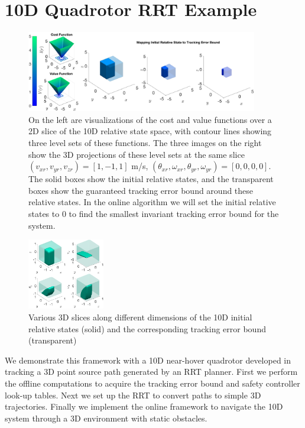 \section{10D Quadrotor RRT Example \label{sec:results}}
\begin{figure}
	\centering
	\includegraphics[width=0.9\textwidth]{fig/quad10D_example_cost}
	\caption{On the left are visualizations of the cost and value functions over a 2D slice of the 10D relative state space, with contour lines showing three level sets of these functions. The three images on the right show the 3D projections of these level sets at the same slice $(v_{xr},v_{yr},v_{zr})=[1, -1, 1]$ m/s, $(\theta_{xr},\omega_{xr},\theta_{yr},\omega_{yr})=[0,0,0,0]$. The solid boxes show the initial relative states, and the transparent boxes show the guaranteed tracking error bound around these relative states. In the online algorithm we will set the initial relative states to 0 to find the smallest invariant tracking error bound for the system.}
	\label{fig:quad10D_example}
	\end{figure} 
\begin{figure}
	\centering
	\includegraphics[width=0.3\textwidth]{fig/quad10D_slices}
	\caption{Various 3D slices along different dimensions of the 10D initial relative states (solid) and the corresponding tracking error bound (transparent)}
	\label{fig:quad10D_example_slices}
\end{figure} 
We demonstrate this framework with a 10D near-hover quadrotor developed in \cite{Bouffard12} tracking a 3D point source path generated by an RRT planner. First we perform the offline computations to acquire the tracking error bound and safety controller look-up tables. Next we set up the RRT to convert paths to simple 3D trajectories. Finally we implement the online framework to navigate the 10D system through a 3D environment with static obstacles.

